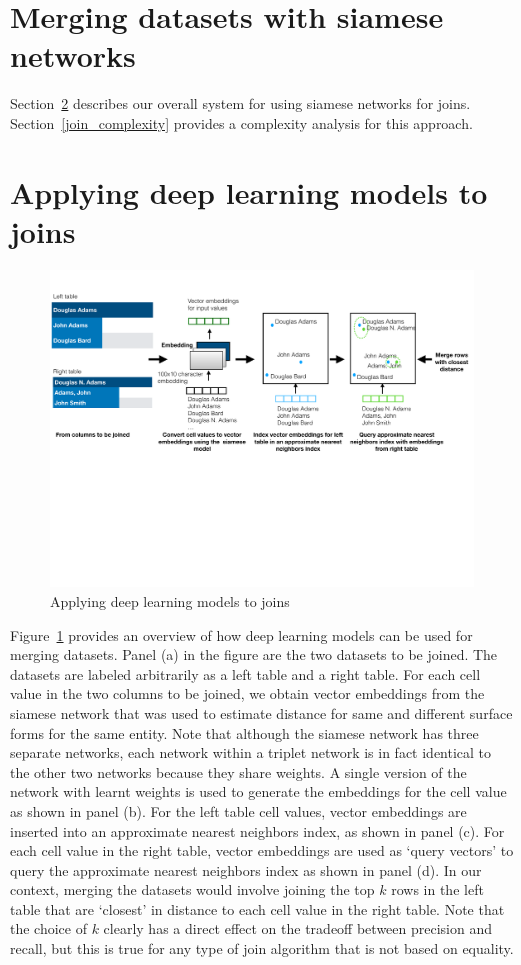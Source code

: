 \section{Merging datasets with siamese networks}
\label{joins}

Section~\ref{join_system} describes our overall system for using siamese networks for joins.  Section~\ref{join_complexity} provides a complexity analysis for this approach.


\section{Applying deep learning models to joins}
\label{join_system}
\begin{figure}
\includegraphics[width=1.0\linewidth]{joins}
\caption{Applying deep learning models to joins}
\label{join_fig}
\end{figure}

Figure~\ref{join_fig} provides an overview of how deep learning models can be used for merging datasets.  Panel (a) in the figure are the two datasets to be joined.  The datasets are labeled arbitrarily as a left table and a right table.  For each cell value in the two columns to be joined, we obtain vector embeddings from the siamese network that was used to estimate distance for same and different surface forms for the same entity.  Note that although the siamese network has three separate networks, each network within a triplet network is in fact identical to the other two networks because they share weights.  A single version of the network with learnt weights is used to generate the embeddings for the cell value as shown in panel (b). For the left table cell values, vector embeddings are inserted into an approximate nearest neighbors index, as shown in panel (c).  For each cell value in the right table, vector embeddings are used as `query vectors' to query the approximate nearest neighbors index as shown in panel (d).  In our context, merging the datasets would involve joining the top $k$ rows in the left table that are `closest' in distance to each cell value in the right table.  Note that the choice of $k$ clearly has a direct effect on the tradeoff between precision and recall, but this is true for any type of join algorithm that is not based on equality.


